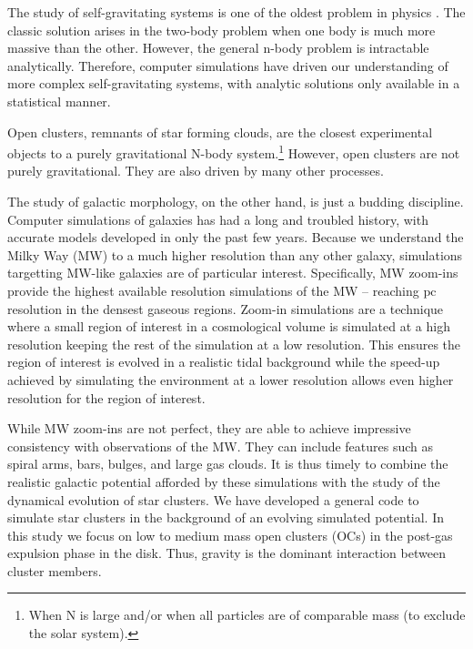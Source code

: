 \documentclass[11pt,letterpaper]{article}
\newcommand{\pc}{\text{pc}}
\begin{document}
\begin{multicols}{2}

The study of self-gravitating systems is one of the oldest problem in physics \citep{Newton1687:Principia}. The classic solution arises in the two-body problem when one body is much more massive than the other. However, the general n-body problem is intractable analytically. Therefore, computer simulations have driven our understanding of more complex self-gravitating systems, with analytic solutions only available in a statistical manner.

Open clusters, remnants of star forming clouds, are the closest experimental objects to a purely gravitational N-body system.\footnote{When N is large and/or when all particles are of comparable mass (to exclude the solar system).} However, open clusters are not purely gravitational. They are also driven by many other processes.

The study of galactic morphology, on the other hand, is just a budding discipline. Computer simulations of galaxies has had a long and troubled history, with accurate models developed in only the past few years. Because we understand the Milky Way (MW) to a much higher resolution than any other galaxy, simulations targetting MW-like galaxies are of particular interest. Specifically, MW zoom-ins provide the highest available resolution simulations of the MW -- reaching $\pc$ resolution in the densest gaseous regions. Zoom-in simulations are a technique where a small region of interest in a cosmological volume is simulated at a high resolution keeping the rest of the simulation at a low resolution. This ensures the region of interest is evolved in a realistic tidal background while the speed-up achieved by simulating the environment at a lower resolution allows even higher resolution for the region of interest.

While MW zoom-ins are not perfect, they are able to achieve impressive consistency with observations of the MW. They can include features such as spiral arms, bars, bulges, and large gas clouds. It is thus timely to combine the realistic galactic potential afforded by these simulations with the study of the dynamical evolution of star clusters. We have developed a general code to simulate star clusters in the background of an evolving simulated potential. In this study we focus on low to medium mass open clusters (OCs) in the post-gas expulsion phase in the disk. Thus, gravity is the dominant interaction between cluster members.


\end{multicols}
\end{document}
